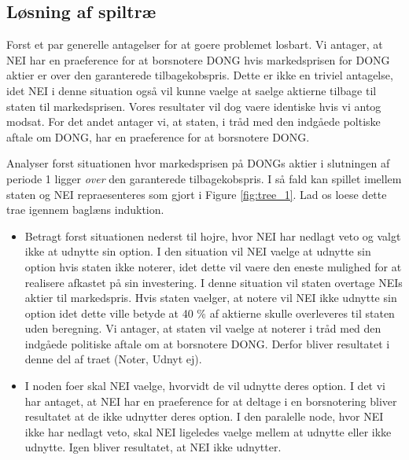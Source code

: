 \documentclass{article}
\begin{document}
\newpage

\FloatBarrier

\begin{appendices}
\renewcommand\appendixname{Appendix}

\section{Løsning af spiltræ}
\label{sec:app_tree}
Forst et par generelle antagelser for at goere problemet losbart. Vi antager, at NEI har en praeference for at borsnotere DONG hvis markedsprisen for DONG aktier er over den garanterede tilbagekobspris. Dette er ikke en triviel antagelse, idet NEI i denne situation også vil kunne vaelge at saelge aktierne tilbage til staten til markedsprisen. Vores resultater vil dog vaere identiske hvis vi antog modsat. For det andet antager vi, at staten, i tråd med den indgåede poltiske aftale om DONG, har en praeference for at borsnotere DONG. %

Analyser forst situationen hvor markedsprisen på DONGs aktier i slutningen af periode 1 ligger \textit{over} den garanterede tilbagekobspris. I så fald kan spillet imellem staten og NEI repraesenteres som gjort i Figure \ref{fig:tree_1}. Lad os loese dette trae igennem baglæns induktion.  

\begin{itemize}

	\item Betragt forst situationen nederst til hojre, hvor NEI har nedlagt veto og valgt ikke at udnytte sin option. I den situation vil NEI vaelge at udnytte sin option hvis staten ikke noterer, idet dette vil vaere den eneste mulighed for at realisere afkastet på sin investering. I denne situation vil staten overtage NEIs aktier til markedspris. Hvis staten vaelger, at notere vil NEI ikke udnytte sin option idet dette ville betyde at 40 \% af aktierne skulle overleveres til staten uden beregning. Vi antager, at staten vil vaelge at noterer i tråd med den indgåede politiske aftale om at borsnotere DONG. Derfor bliver resultatet i denne del af traet (Noter, Udnyt ej).

	\item I noden foer skal NEI vaelge, hvorvidt de vil udnytte deres option. I det vi har antaget, at NEI har en praeference for at deltage i en borsnotering bliver resultatet at de ikke udnytter deres option. I den paralelle node, hvor NEI ikke har nedlagt veto, skal NEI ligeledes vaelge mellem at udnytte eller ikke udnytte. Igen bliver resultatet, at NEI ikke udnytter.
	

\end{itemize}
\end{appendices}
\end{document}
